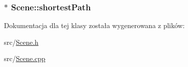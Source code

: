 \hypertarget{class_scene_a279299a043594536431e538c2bdd76e7}{
\subsubsection[{shortest\-Path}]{$\ast$ Scene\-::shortest\-Path\hspace{0.3cm}{\ttfamily [protected]}}}\label{class_scene_a279299a043594536431e538c2bdd76e7}


Dokumentacja dla tej klasy została wygenerowana z plików\-:\begin{DoxyCompactItemize}
\item 
src/\hyperlink{_scene_8h}{Scene.\-h}\item 
src/\hyperlink{_scene_8cpp}{Scene.\-cpp}\end{DoxyCompactItemize}
